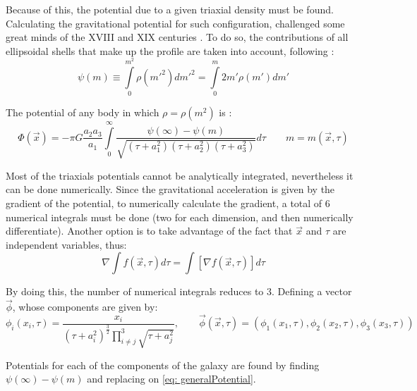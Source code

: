 		Because of this, the potential due to a given triaxial density must be found. Calculating the gravitational potential for such configuration, challenged some great minds of the XVIII and XIX centuries \cite{binney2011galactic}. To do so, the contributions of all ellipsoidal shells that make up the profile are taken into account, following \citeauthor{binney2011galactic}:
		\begin{equation}
			\psi(m) \equiv \int\limits_{0}^{m^2} \rho(m'^2)dm'^2 = \int\limits_{0}^{m} 2m'\rho(m')dm' 
		\end{equation}
		
		The potential of any body in which $\rho = \rho(m^2)$ is \cite{binney2011galactic}:
		\begin{equation}\label{eq: generalPotential}
		\Phi(\vec{x}) = -\pi G \dfrac{a_2a_3}{a_1}\int\limits_{0}^{\infty}\dfrac{\psi(\infty) - \psi(m)}{\sqrt{(\tau + a_1^2)(\tau + a_2^2)(\tau + a_3^2)}}d\tau \qquad m = m(\vec{x}, \tau)
		\end{equation}
		
		Most of the triaxials potentials cannot be analytically integrated, nevertheless it can be done numerically. Since the gravitational acceleration is given by the gradient of the potential, to numerically calculate the gradient, a total of 6 numerical integrals must be done (two for each dimension, and then numerically differentiate). Another option is to take advantage of the fact that $\vec{x}$ and $\tau$ are independent variables, thus:
		\begin{equation}
			\nabla \int f(\vec{x}, \tau)d\tau = \int [\nabla f(\vec{x}, \tau)] d\tau
		\end{equation}
		
		By doing this, the number of numerical integrals reduces to 3. Defining a vector $\vec{\phi}$, whose components are given by:
		\begin{equation}
			\phi_i(x_i, \tau) = \dfrac{x_i}{\left(\tau + a_i^2\right)^{\frac{3}{2}} \prod\limits_{i \neq j}^3\sqrt{\tau + a_j^2}}, \qquad \vec{\phi}(\vec{x}, \tau) = (\phi_1(x_1, \tau), \phi_2(x_2, \tau), \phi_3(x_3, \tau))
		\end{equation}
		
		Potentials for each of the components of the galaxy are found by finding $\psi(\infty) - \psi(m)$ and replacing on \autoref{eq: generalPotential}.
		
